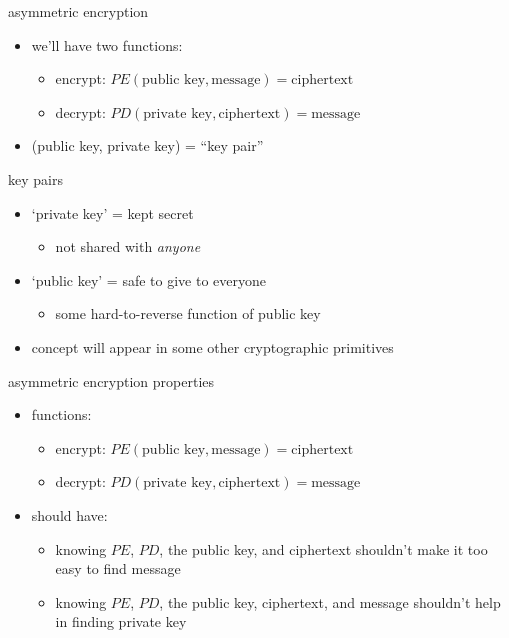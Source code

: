 \begin{frame}{asymmetric encryption}
\begin{itemize}
\item we'll have two functions:
    \begin{itemize}
    \item encrypt: $PE(\text{public key}, \text{message}) = \text{ciphertext}$
    \item decrypt: $PD(\text{private key}, \text{ciphertext}) = \text{message}$
    \end{itemize}
\item (public key, private key) = ``key pair''
\end{itemize}
\end{frame}

\begin{frame}{key pairs}
    \begin{itemize}
    \item `private key' = kept secret
        \begin{itemize}
        \item not shared with \textit{anyone}
        \end{itemize}
    \item `public key' = safe to give to everyone
        \begin{itemize}
        \item some hard-to-reverse function of public key
        \end{itemize}
    \vspace{.5cm}
    \item concept will appear in some other cryptographic primitives
    \end{itemize}
\end{frame}

\begin{frame}{asymmetric encryption properties}
\begin{itemize}
\item functions:
    \begin{itemize}
    \item encrypt: $PE(\text{public key}, \text{message}) = \text{ciphertext}$
    \item decrypt: $PD(\text{private key}, \text{ciphertext}) = \text{message}$
    \end{itemize}
\item should have:
    \begin{itemize}
    \item knowing $PE$, $PD$, the public key, and ciphertext shouldn't make it too easy to find message
    \item knowing $PE$, $PD$, the public key, ciphertext, and message shouldn't help in finding private key
    \end{itemize}
\end{itemize}
\end{frame}

